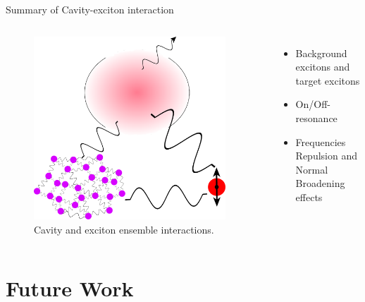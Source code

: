 \documentclass{beamer}
\begin{document}
\begin{frame}{Summary of Cavity-exciton interaction}
\begin{columns}
\begin{figure}[thp]%
\centering
\begin{center}
\includegraphics[width=0.95\textwidth]{./Figs/Cavity_BackgroundDipoles_TargetDipole} %
\end{center}
\caption[Cavity and exciton ensemble interaction.]{\fontsize{8}{0.2}\selectfont Cavity and exciton ensemble interactions. 
}
\end{figure}
\fontsize{8}{0.2}\selectfont
\begin{itemize}
\item Background excitons and target excitons
\item On/Off-resonance
\item Frequencies Repulsion and Normal Broadening effects
\end{itemize}
\end{columns}
\end{frame}


\section{Future Work}
\end{document}
